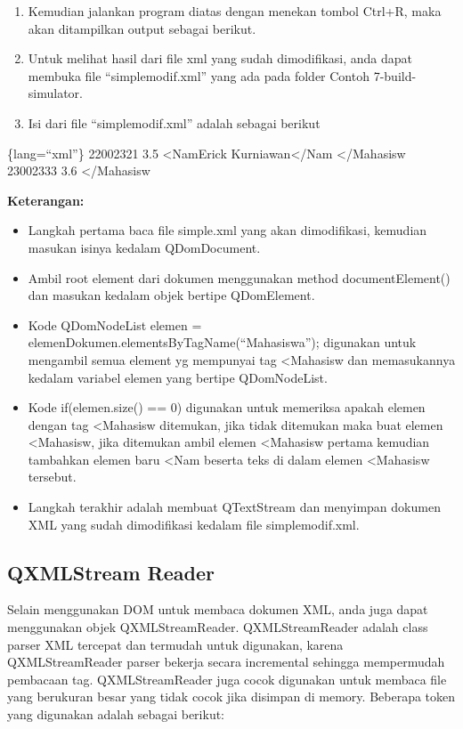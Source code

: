 \begin{enumerate}
\def\labelenumi{\arabic{enumi}.}
\setcounter{enumi}{3}
\tightlist
\item
  Kemudian jalankan program diatas dengan menekan tombol Ctrl+R, maka
  akan ditampilkan output sebagai berikut.
\item
  Untuk melihat hasil dari file xml yang sudah dimodifikasi, anda dapat
  membuka file ``simplemodif.xml'' yang ada pada folder Contoh
  7-build-simulator.
\item
  Isi dari file ``simplemodif.xml'' adalah sebagai berikut
\end{enumerate}

\{lang=``xml''\} 22002321 3.5 \textless{}NamErick
Kurniawan\textless{}/Nam \textless{}/Mahasisw 23002333 3.6
\textless{}/Mahasisw

\textbf{Keterangan:}

\begin{itemize}
\tightlist
\item
  Langkah pertama baca file simple.xml yang akan dimodifikasi, kemudian
  masukan isinya kedalam QDomDocument.
\item
  Ambil root element dari dokumen menggunakan method documentElement()
  dan masukan kedalam objek bertipe QDomElement.
\item
  Kode QDomNodeList elemen =
  elemenDokumen.elementsByTagName(``Mahasiswa''); digunakan untuk
  mengambil semua element yg mempunyai tag \textless{}Mahasisw dan
  memasukannya kedalam variabel elemen yang bertipe QDomNodeList.
\item
  Kode if(elemen.size() == 0) digunakan untuk memeriksa apakah elemen
  dengan tag \textless{}Mahasisw ditemukan, jika tidak ditemukan maka
  buat elemen \textless{}Mahasisw, jika ditemukan ambil elemen
  \textless{}Mahasisw pertama kemudian tambahkan elemen baru
  \textless{}Nam beserta teks di dalam elemen \textless{}Mahasisw
  tersebut.
\item
  Langkah terakhir adalah membuat QTextStream dan menyimpan dokumen XML
  yang sudah dimodifikasi kedalam file simplemodif.xml.
\end{itemize}

\subsection{QXMLStream Reader}\label{qxmlstream-reader}

Selain menggunakan DOM untuk membaca dokumen XML, anda juga dapat
menggunakan objek QXMLStreamReader. QXMLStreamReader adalah class parser
XML tercepat dan termudah untuk digunakan, karena QXMLStreamReader
parser bekerja secara incremental sehingga mempermudah pembacaan tag.
QXMLStreamReader juga cocok digunakan untuk membaca file yang berukuran
besar yang tidak cocok jika disimpan di memory. Beberapa token yang
digunakan adalah sebagai berikut:

